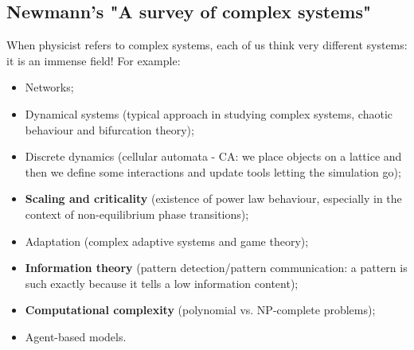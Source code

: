 \documentclass[\main/main.tex]{subfiles}
\begin{document}
\subsection{Newmann's "A survey of complex systems"}
When physicist refers to complex systems, each of us think very different systems: it is an immense field! For example:
\begin{itemize}
    \item Networks;
    \item Dynamical systems (typical approach in studying complex systems, chaotic behaviour and bifurcation theory);
    \item Discrete dynamics (cellular automata - CA: we place objects on a lattice and then we define some interactions and update tools letting the simulation go);
    \item \textbf{Scaling and criticality} (existence of power law behaviour, especially in the context of non-equilibrium phase transitions);
    \item Adaptation (complex adaptive systems and game theory);
    \item \textbf{Information theory} (pattern detection/pattern communication: a pattern is such exactly because it tells a low information content);
    \item \textbf{Computational complexity}  (polynomial vs. NP-complete problems);
    \item Agent-based models.
\end{itemize}
\end{document}
